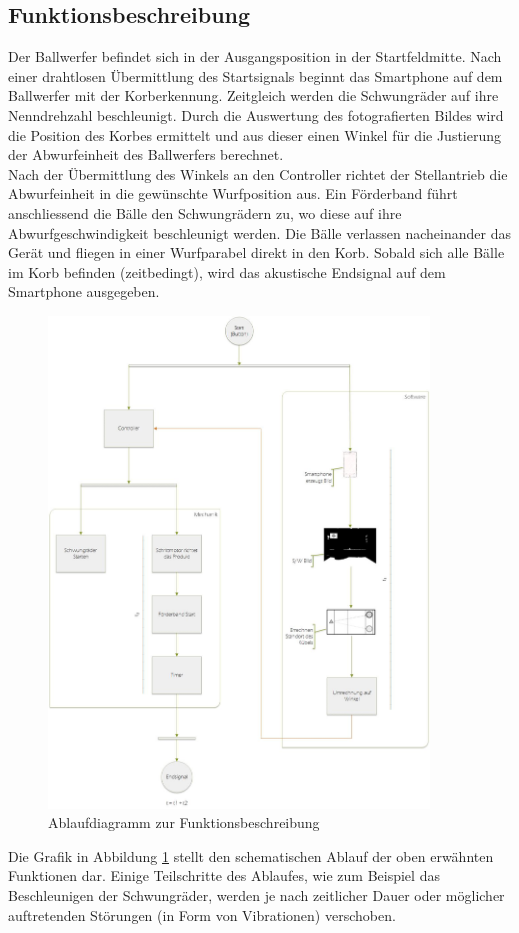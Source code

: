 \subsection{Funktionsbeschreibung}
Der Ballwerfer befindet sich in der Ausgangsposition in der Startfeldmitte. 
Nach einer drahtlosen Übermittlung des Startsignals beginnt das Smartphone auf 
dem Ballwerfer mit der Korberkennung. Zeitgleich werden die Schwungräder auf ihre Nenndrehzahl beschleunigt.
Durch die Auswertung des fotografierten Bildes wird die Position des Korbes ermittelt und aus dieser einen 
Winkel für die Justierung der Abwurfeinheit des Ballwerfers berechnet.\\
Nach der Übermittlung des Winkels an den Controller richtet der Stellantrieb die Abwurfeinheit in die gewünschte Wurfposition aus. 
Ein Förderband führt anschliessend die Bälle den Schwungrädern zu, wo diese auf ihre Abwurfgeschwindigkeit beschleunigt werden. 
Die Bälle verlassen nacheinander das Gerät und fliegen in einer Wurfparabel direkt in den Korb. Sobald sich alle Bälle im Korb befinden (zeitbedingt),
wird das akustische Endsignal auf dem Smartphone ausgegeben.\\
\newpage

\begin{figure}[h!]
	\centering
	\includegraphics[width=0.9\textwidth]{Enddokumentation/Loesungskonzept/Bilder/FlowOnChart_v2.jpg}
	\caption{Ablaufdiagramm zur Funktionsbeschreibung}
	\label{fig:FlowChart}
\end{figure}
Die Grafik in Abbildung \ref{fig:FlowChart} stellt den schematischen Ablauf der oben erwähnten Funktionen dar. 
Einige Teilschritte des Ablaufes, wie zum Beispiel das Beschleunigen der Schwungräder, werden 
je nach zeitlicher Dauer oder möglicher auftretenden Störungen (in Form von Vibrationen) verschoben.